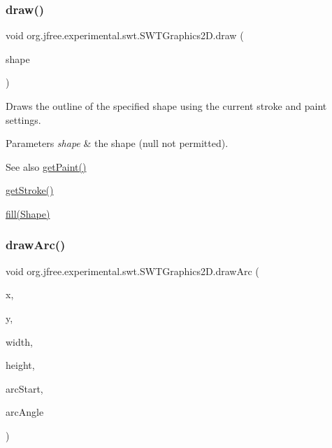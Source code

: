 \subsubsection{\texorpdfstring{draw()}{draw()}}
{\footnotesize\ttfamily void org.\+jfree.\+experimental.\+swt.\+S\+W\+T\+Graphics2\+D.\+draw (\begin{DoxyParamCaption}\item[{Shape}]{shape }\end{DoxyParamCaption})}

Draws the outline of the specified shape using the current stroke and paint settings.


\begin{DoxyParams}{Parameters}
{\em shape} & the shape ({\ttfamily null} not permitted).\\
\hline
\end{DoxyParams}
\begin{DoxySeeAlso}{See also}
\mbox{\hyperlink{classorg_1_1jfree_1_1experimental_1_1swt_1_1_s_w_t_graphics2_d_a89618656bba11128fda80e24a4b944a8}{get\+Paint()}} 

\mbox{\hyperlink{classorg_1_1jfree_1_1experimental_1_1swt_1_1_s_w_t_graphics2_d_ab44f8c6b4ef40396fa3c34e7be4b2b7a}{get\+Stroke()}} 

\mbox{\hyperlink{classorg_1_1jfree_1_1experimental_1_1swt_1_1_s_w_t_graphics2_d_a99e7ceabaaaf4f1ec0c9545a8765ee10}{fill(\+Shape)}} 
\end{DoxySeeAlso}
\mbox{\label{classorg_1_1jfree_1_1experimental_1_1swt_1_1_s_w_t_graphics2_d_ab2d3057a56a280030f5170021933aad1}} 
\subsubsection{\texorpdfstring{draw\+Arc()}{drawArc()}}
{\footnotesize\ttfamily void org.\+jfree.\+experimental.\+swt.\+S\+W\+T\+Graphics2\+D.\+draw\+Arc (\begin{DoxyParamCaption}\item[{int}]{x,  }\item[{int}]{y,  }\item[{int}]{width,  }\item[{int}]{height,  }\item[{int}]{arc\+Start,  }\item[{int}]{arc\+Angle }\end{DoxyParamCaption})}

